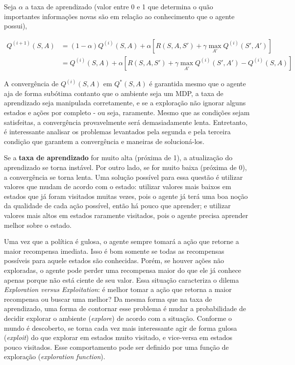 Seja $\alpha$ a taxa de aprendizado (valor entre 0 e 1 que determina o quão importantes informações novas são em relação ao conhecimento que o agente possui),

\begin{equation} \label{eq:q_update}
\begin{align*}
Q^{(i+1)}(S,A) &= (1-\alpha)Q^{(i)}(S,A) + \alpha[R(S,A,S') + \gamma \max_{A'}Q^{(i)}(S',A')] \\
            &= Q^{(i)}(S,A) + \alpha[R(S,A,S') + \gamma \max_{A'}Q^{(i)}(S',A') - Q^{(i)}(S,A)]
\end{align*}
\end{equation}

A convergência de $Q^{(i)}(S,A)$ em $Q^{*}(S,A)$ é garantida mesmo que o agente aja de forma subótima contanto que o ambiente seja um MDP, a taxa de aprendizado seja manipulada corretamente, e se a exploração não ignorar alguns estados e ações por completo - ou seja, raramente. Mesmo que as condições sejam satisfeitas, a convergência provavelmente será demasiadamente lenta. Entretanto, é interessante analisar os problemas levantados pela segunda e pela terceira condição que garantem a convergência e maneiras de solucioná-los.

Se a \textbf{taxa de aprendizado} for muito alta (próxima de 1), a atualização do aprendizado se torna instável. Por outro lado, se for muito baixa (próxima de 0), a convergência se torna lenta. Uma solução possível para essa questão é utilizar valores que mudam de acordo com o estado: utilizar valores mais baixos em estados que já foram visitados muitas vezes, pois o agente já terá uma boa noção da qualidade de cada ação possível, então há pouco que aprender; e utilizar valores mais altos em estados raramente visitados, pois o agente precisa aprender melhor sobre o estado.

Uma vez que a política é gulosa, o agente sempre tomará a ação que retorne a maior recompensa imediata. Isso é bom somente se todas as recompensas possíveis para aquele estados são conhecidas. Porém, se houver ações não exploradas, o agente pode perder uma recompensa maior do que ele já conhece apenas porque não está ciente de seu valor. Essa situação caracteriza o dilema \textit{Exploration versus Exploitation}: é melhor tomar a ação que retorna a maior recompensa ou buscar uma melhor? Da mesma forma que na taxa de aprendizado, uma forma de contornar esse problema é mudar a probabilidade de decidir explorar o ambiente (\textit{explore}) de acordo com a situação. Conforme o mundo é descoberto, se torna cada vez mais interessante agir de forma gulosa (\textit{exploit}) do que explorar em estados muito visitado, e vice-versa em estados pouco visitados. Esse comportamento pode ser definido por uma função de exploração (\textit{exploration function}).

